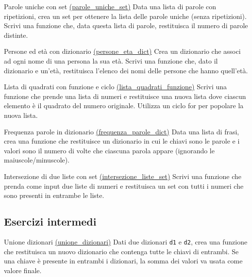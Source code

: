 \begin{esercizio}{Parole uniche con set \href{run:./files/python/parole_uniche_set/}{(parole\_uniche\_set)}}
	Data una lista di parole con ripetizioni, crea un set per ottenere la lista delle parole uniche (senza ripetizioni). Scrivi una funzione che, data questa lista di parole, restituisca il numero di parole distinte.
\end{esercizio} \label{parole_uniche_set}

\begin{esercizio}{Persone ed età con dizionario \href{run:./files/python/persone_eta_dict/}{(persone\_eta\_dict)}}
	Crea un dizionario che associ ad ogni nome di una persona la sua età. Scrivi una funzione che, dato il dizionario e un’età, restituisca l’elenco dei nomi delle persone che hanno quell’età.
\end{esercizio} \label{persone_eta_dict}

\begin{esercizio}{Lista di quadrati con funzione e ciclo \href{run:./files/python/lista_quadrati_funzione/}{(lista\_quadrati\_funzione)}}
	Scrivi una funzione che prende una lista di numeri e restituisce una nuova lista dove ciascun elemento è il quadrato del numero originale. Utilizza un ciclo for per popolare la nuova lista.
\end{esercizio} \label{lista_quadrati_funzione}

\begin{esercizio}{Frequenza parole in dizionario \href{run:./files/python/frequenza_parole_dict/}{(frequenza\_parole\_dict)}}
	Data una lista di frasi, crea una funzione che restituisce un dizionario in cui le chiavi sono le parole e i valori sono il numero di volte che ciascuna parola appare (ignorando le maiuscole/minuscole).
\end{esercizio} \label{frequenza_parole_dict}

\begin{esercizio}{Intersezione di due liste con set \href{run:./files/python/intersezione_liste_set/}{(intersezione\_liste\_set)}}
	Scrivi una funzione che prenda come input due liste di numeri e restituisca un set con tutti i numeri che sono presenti in entrambe le liste.
\end{esercizio} \label{intersezione_liste_set}


\subsection{Esercizi intermedi}
\begin{esercizio}{Unione dizionari \href{run:./files/python/unione_dizionari/}{(unione\_dizionari)}}
	Dati due dizionari \verb|d1| e \verb|d2|, crea una funzione che restituisca un nuovo dizionario che contenga tutte le chiavi di entrambi. Se una chiave è presente in entrambi i dizionari, la somma dei valori va usata come valore finale.
\end{esercizio} \label{unione_dizionari}

